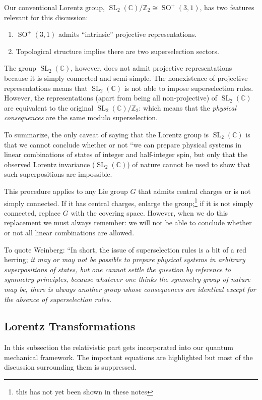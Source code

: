 \documentclass[10pt]{article}
\newcommand{\bZ}{\mathbb Z}
\newcommand{\bC}{\mathbb{C}}
\theoremstyle{plain}
\theoremstyle{definition}
\theoremstyle{remark}
\DeclareMathOperator{\SL}{SL}
\DeclareMathOperator{\SO}{SO}
\begin{document}
\noindent Our conventional Lorentz group, $\SL_2(\bC)/\bZ_2 \cong
\SO^+(3,1)$, has two features relevant for this discussion:
\begin{enumerate}
    \item $\SO^+(3,1)$ admits ``intrinsic'' projective representations.
    \item Topological structure implies there are two superselection sectors.
\end{enumerate}
The group $\SL_2(\bC)$, however, does not admit projective
representations because it is simply connected and semi-simple. The
nonexistence of projective representations means that $\SL_2(\bC)$ is
not able to impose superselection rules. However, the representations
(apart from being all non-projective) of $\SL_2(\bC)$ are equivalent
to the original $\SL_2(\bC)/\bZ_2$: which means that the
\emph{physical consequences} are the same modulo superselection.

To summarize, the only caveat of saying that the Lorentz group is
$\SL_2(\bC)$ is that we cannot conclude whether or not ``we can prepare
physical systems in linear combinations of states of integer and
half-integer spin, but only that the observed Lorentz invariance
($\SL_2(\bC)$) of nature cannot be used to show that such
superpositions are impossible.

This procedure applies to any Lie group $G$ that admits central
charges or is not simply connected. If it has central charges, enlarge
the group;\footnote{this has not yet been shown in these notes} if it
is not simply connected, replace $G$ with the covering space. However,
when we do this replacement we must always remember: we will not be
able to conclude whether or not all linear combinations are allowed.

To quote Weinberg:
``In short, the issue of superselection rules is a bit of a red
herring; \emph{it may or may not be possible to prepare physical
systems in arbitrary superpositions of states, but one cannot settle
the question by reference to symmetry principles, because whatever one
thinks the symmetry group of nature may be, there is always another
group whose consequences are identical except for the absence of
superselection rules.}


\subsection{Lorentz Transformations}\label{SS:rqm-lorentz}
In this subsection the relativistic part gets incorporated into our quantum
mechanical framework. The important equations are highlighted but most
of the discussion surrounding them is suppressed.
\end{document}
